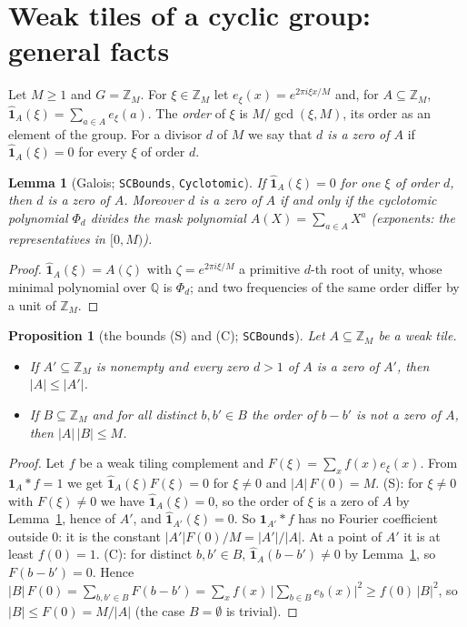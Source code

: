 \documentclass[11pt,a4paper]{amsart}
\newtheorem{proposition}[theorem]{Proposition}
\newtheorem{lemma}[theorem]{Lemma}
\theoremstyle{definition}
\theoremstyle{remark}
\newcommand{\Z}{\mathbb{Z}}
\newcommand{\Q}{\mathbb{Q}}
\newcommand{\one}{\mathbf{1}}
\newcommand{\lean}[1]{\texttt{#1}}
\begin{document}
\section{Weak tiles of a cyclic group: general facts}\label{sec:general}

Let $M\ge 1$ and $G=\Z_M$. For $\xi\in\Z_M$ let $e_\xi(x)=e^{2\pi i\xi x/M}$ and, for $A\subseteq\Z_M$,
$\hat{\one}_A(\xi)=\sum_{a\in A}e_\xi(a)$. The \emph{order} of $\xi$ is $M/\gcd(\xi,M)$, its order as an element
of the group. For a divisor $d$ of $M$ we say that \emph{$d$ is a zero of $A$} if $\hat{\one}_A(\xi)=0$ for
every $\xi$ of order $d$.

\begin{lemma}[Galois; \lean{SCBounds}, \lean{Cyclotomic}]\label{lem:gal}
If $\hat{\one}_A(\xi)=0$ for one $\xi$ of order $d$, then $d$ is a zero of $A$. Moreover $d$ is a zero of $A$ if
and only if the cyclotomic polynomial $\Phi_d$ divides the mask polynomial $A(X)=\sum_{a\in A}X^a$ (exponents: the
representatives in $[0,M)$).
\end{lemma}
\begin{proof}
$\hat{\one}_A(\xi)=A(\zeta)$ with $\zeta=e^{2\pi i\xi/M}$ a primitive $d$-th root of unity, whose minimal
polynomial over $\Q$ is $\Phi_d$; and two frequencies of the same order differ by a unit of $\Z_M$.
\end{proof}

\begin{proposition}[the bounds (S) and (C); \lean{SCBounds}]\label{prop:SC}
Let $A\subseteq\Z_M$ be a weak tile.
\begin{itemize}
\item[\textup{(S)}] If $A'\subseteq\Z_M$ is nonempty and every zero $d>1$ of $A$ is a zero of $A'$, then $|A|\le|A'|$.
\item[\textup{(C)}] If $B\subseteq\Z_M$ and for all distinct $b,b'\in B$ the order of $b-b'$ is not a zero of $A$, then
 $|A|\,|B|\le M$.
\end{itemize}
\end{proposition}
\begin{proof}
Let $f$ be a weak tiling complement and $F(\xi)=\sum_xf(x)e_\xi(x)$. From $\one_A*f=1$ we get
$\hat{\one}_A(\xi)F(\xi)=0$ for $\xi\ne0$ and $|A|\,F(0)=M$. (S): for $\xi\ne 0$ with $F(\xi)\ne0$ we have
$\hat{\one}_A(\xi)=0$, so the order of $\xi$ is a zero of $A$ by Lemma~\ref{lem:gal}, hence of $A'$, and
$\hat{\one}_{A'}(\xi)=0$. So $\one_{A'}*f$ has no Fourier coefficient outside $0$: it is the constant
$|A'|F(0)/M=|A'|/|A|$. At a point of $A'$ it is at least $f(0)=1$. (C): for distinct $b,b'\in B$,
$\hat{\one}_A(b-b')\ne0$ by Lemma~\ref{lem:gal}, so $F(b-b')=0$. Hence
$|B|\,F(0)=\sum_{b,b'\in B}F(b-b')=\sum_xf(x)\,\bigl|\sum_{b\in B}e_b(x)\bigr|^2\ge f(0)\,|B|^2$, so
$|B|\le F(0)=M/|A|$ (the case $B=\emptyset$ is trivial).
\end{proof}
\end{document}
